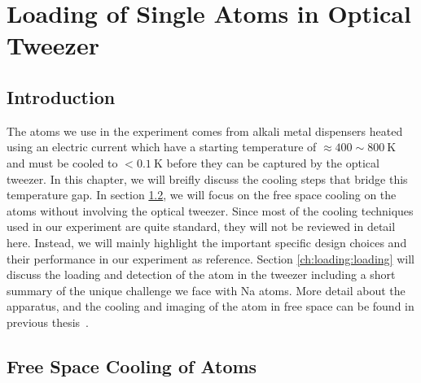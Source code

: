 
\chapter{Loading of Single Atoms in Optical Tweezer}
\label{ch:loading}

\section{Introduction}
\label{ch:loading:introduction}

The atoms we use in the experiment comes from alkali metal dispensers
heated using an electric current which have a starting temperature of
$\approx\!400\sim800~\mathrm{K}$ and must be cooled to $<\!0.1~\mathrm{K}$
before they can be captured by the optical tweezer.
In this chapter, we will breifly discuss the cooling steps that bridge this temperature gap.
In section \ref{ch:loading:free-space}, we will focus on the free space cooling
on the atoms without involving the optical tweezer.
Since most of the cooling techniques used in our experiment are quite standard,
they will not be reviewed in detail here.
Instead, we will mainly highlight the important specific design choices
and their performance in our experiment as reference.
Section \ref{ch:loading:loading} will discuss the loading and detection
of the atom in the tweezer including a short summary of the unique challenge
we face with Na atoms.
More detail about the apparatus, and the cooling and imaging of the atom
in free space can be found in previous thesis~\cite{liu_building_2019}.

\section{Free Space Cooling of Atoms}
\label{ch:loading:free-space}

